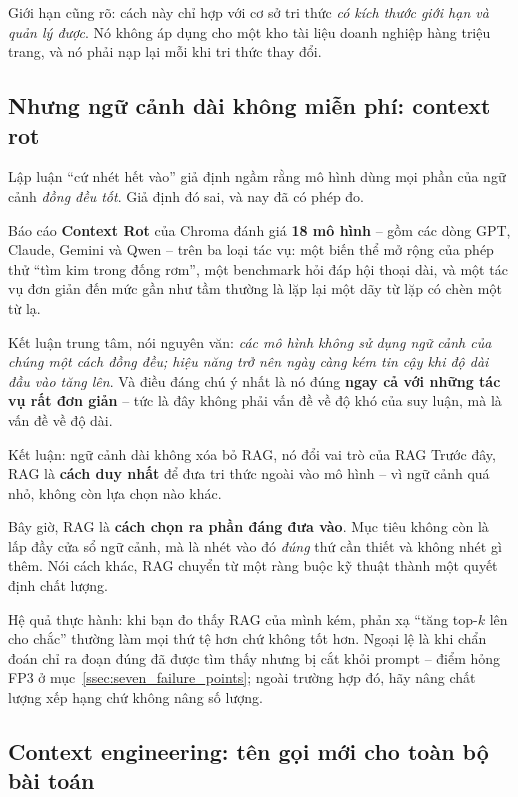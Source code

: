 Giới hạn cũng rõ: cách này chỉ hợp với cơ sở tri thức \emph{có kích thước giới hạn và quản lý được}. Nó không áp dụng cho một kho tài liệu doanh nghiệp hàng triệu trang, và nó phải nạp lại mỗi khi tri thức thay đổi.

\subsection{Nhưng ngữ cảnh dài không miễn phí: context rot}
\label{ssec:context_rot}

Lập luận “cứ nhét hết vào” giả định ngầm rằng mô hình dùng mọi phần của ngữ cảnh \emph{đồng đều tốt}. Giả định đó sai, và nay đã có phép đo.

Báo cáo \textbf{Context Rot} của Chroma \cite{hong2025contextrot} đánh giá \textbf{18 mô hình} -- gồm các dòng GPT, Claude, Gemini và Qwen -- trên ba loại tác vụ: một biến thể mở rộng của phép thử “tìm kim trong đống rơm”, một benchmark hỏi đáp hội thoại dài, và một tác vụ đơn giản đến mức gần như tầm thường là lặp lại một dãy từ lặp có chèn một từ lạ.

Kết luận trung tâm, nói nguyên văn: \emph{các mô hình không sử dụng ngữ cảnh của chúng một cách đồng đều; hiệu năng trở nên ngày càng kém tin cậy khi độ dài đầu vào tăng lên}. Và điều đáng chú ý nhất là nó đúng \textbf{ngay cả với những tác vụ rất đơn giản} -- tức là đây không phải vấn đề về độ khó của suy luận, mà là vấn đề về độ dài.

\begin{keyidea}{Kết luận: ngữ cảnh dài không xóa bỏ RAG, nó đổi vai trò của RAG}
Trước đây, RAG là \textbf{cách duy nhất} để đưa tri thức ngoài vào mô hình -- vì ngữ cảnh quá nhỏ, không còn lựa chọn nào khác.

Bây giờ, RAG là \textbf{cách chọn ra phần đáng đưa vào}. Mục tiêu không còn là lấp đầy cửa sổ ngữ cảnh, mà là nhét vào đó \emph{đúng} thứ cần thiết và không nhét gì thêm. Nói cách khác, RAG chuyển từ một ràng buộc kỹ thuật thành một quyết định chất lượng.

Hệ quả thực hành: khi bạn đo thấy RAG của mình kém, phản xạ “tăng top-$k$ lên cho chắc” thường làm mọi thứ tệ hơn chứ không tốt hơn. Ngoại lệ là khi chẩn đoán chỉ ra đoạn đúng đã được tìm thấy nhưng bị cắt khỏi prompt -- điểm hỏng FP3 ở mục~\ref{ssec:seven_failure_points}; ngoài trường hợp đó, hãy nâng chất lượng xếp hạng chứ không nâng số lượng.
\end{keyidea}

\subsection{Context engineering: tên gọi mới cho toàn bộ bài toán}
\label{ssec:context_engineering}

